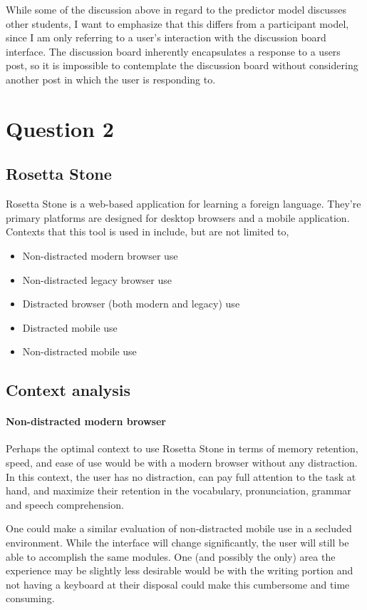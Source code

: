 While some of the discussion above in regard to the predictor model discusses other students, I want to emphasize that this differs from a participant model, since I am only referring to a user's interaction with the discussion board interface. The discussion board inherently encapsulates a response to a users post, so it is impossible to contemplate the discussion board without considering another post in which the user is responding to.

\section{Question 2}

\subsection{Rosetta Stone}

Rosetta Stone is a web-based application for learning a foreign language. They're primary platforms are designed for desktop browsers and a mobile application. Contexts that this tool is used in include, but are not limited to,

\begin{itemize}
\item
  Non-distracted modern browser use
\item
  Non-distracted legacy browser use
\item
  Distracted browser (both modern and legacy) use
\item
  Distracted mobile use
\item
  Non-distracted mobile use
\end{itemize}

\subsection{Context analysis}

\paragraph{Non-distracted modern browser}
Perhaps the optimal context to use Rosetta Stone in terms of memory retention, speed, and ease of use would be with a modern browser without any distraction. In this context, the user has no distraction, can pay full attention to the task at hand, and maximize their retention in the vocabulary, pronunciation, grammar and speech comprehension.

One could make a similar evaluation of non-distracted mobile use in a secluded environment. While the interface will change significantly, the user will still be able to accomplish the same modules. One (and possibly the only) area the experience may be slightly less desirable would be with the writing portion and not having a keyboard at their disposal could make this cumbersome and time consuming.

